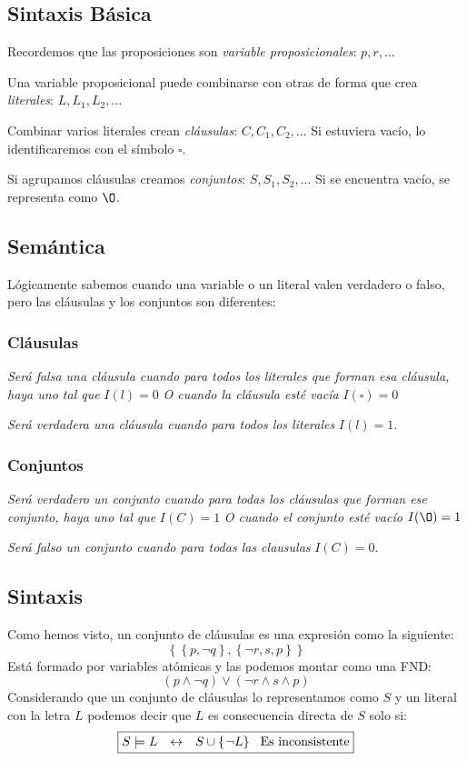\subsection{Sintaxis Básica}
\noindent Recordemos que las proposiciones son \textit{variable proposicionales}: \(p,r,...\)
\par\noindent Una variable proposicional puede combinarse con otras de forma que crea \textit{literales}: \(L,L_1,L_2,...\)
\par\noindent Combinar varios literales crean \textit{cláusulas}: \(C,C_1,C_2,...\) Si estuviera vacío, lo identificaremos con el símbolo \(\square\).
\par\noindent Si agrupamos cláusulas creamos \textit{conjuntos}: \(S,S_1,S_2,...\) Si se encuentra vacío, se representa como \(\O\).
\subsection{Semántica}
\noindent Lógicamente sabemos cuando una variable o un literal valen verdadero o falso, pero las cláusulas y los conjuntos son diferentes:
\subsubsection{Cláusulas}
\noindent \textit{Será falsa una cláusula cuando para todos los literales que forman esa cláusula, haya uno tal que} \(I(l) = 0\) \textit{O cuando la cláusula esté vacía} \(I(\square) = 0\)
\par \noindent \textit{Será verdadera una cláusula cuando para todos los literales} \(I(l) = 1\).
\subsubsection{Conjuntos}
\noindent \textit{Será verdadero un conjunto cuando para todas los cláusulas que forman ese conjunto, haya uno tal que} \(I(C) = 1\) \textit{O cuando el conjunto esté vacío} \(I(\O) = 1\)
\par \noindent \textit{Será falso un conjunto cuando para todas las clausulas} \(I(C) = 0\).
\subsection{Sintaxis}
\noindent Como hemos visto, un conjunto de cláusulas es una expresión como la siguiente:
\[
        \boxed{\left \{ \left. \left \{ \left. p, \neg q \right \} , \left \{ \left. \neg r, s, p \right \} \right.\right. \right \} \right.}
\]
\noindent Está formado por variables atómicas y las podemos montar como una FND:
\[
        \boxed{(p \land \neg q) \lor (\neg r \land s \land p)}
\]
\noindent Considerando que un conjunto de cláusulas lo representamos como \(S\) y un literal con la letra \(L\) podemos decir que \(L\) es consecuencia directa de \(S\) solo si:
\[
        \boxed{S \models L \hspace{2.5mm}\leftrightarrow \hspace{2.5mm} S \cup \left \{ \left. \neg L \right \} \right. \hspace{2mm}\text{Es inconsistente}}
\]